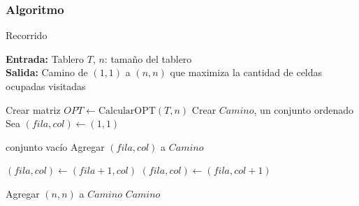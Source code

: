 \subsubsection{Algoritmo}

\begin{algorithm}
	\caption{Recorrido}
	\label{alg:recorrido}
	\textbf{Entrada:} Tablero $T$, $n$: tamaño del tablero \\
	\textbf{Salida:} Camino de $(1,1)$ a $(n,n)$ que maximiza la cantidad de celdas ocupadas visitadas
	\begin{algorithmic}[1]
		\State Crear matriz $OPT \gets \text{CalcularOPT}(T, n)$
		\State Crear $Camino$, un conjunto ordenado
		\State Sea $(fila, col) \gets (1, 1)$

		\State \Return conjunto vacío 
		\EndIf
		\State Agregar $(fila, col)$ a $Camino$

		\State $(fila, col) \gets (fila+1, col)$
		\Else
		\State $(fila, col) \gets (fila, col+1)$
		\EndIf
		\EndWhile

		\State Agregar $(n, n)$ a $Camino$
		\State \Return $Camino$
	\end{algorithmic}
\end{algorithm}